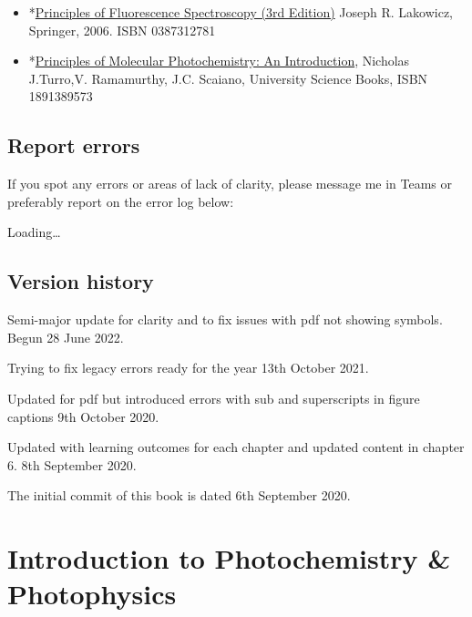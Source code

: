\documentclass[
]{book}
\begin{document}
\begin{itemize}
\item
  *\href{https://link.springer.com/book/10.1007/978-0-387-46312-4}{Principles of Fluorescence Spectroscopy (3rd Edition)} Joseph R. Lakowicz, Springer, 2006. ISBN 0387312781
\item
  *\href{https://bath-ac-primo.hosted.exlibrisgroup.com/primo-explore/fulldisplay?docid=44BAT_ALMA_DS2129552010002761\&context=L\&vid=44BAT_VU1\&lang=en_US\&search_scope=CSCOP_44BAT_DEEP\&adaptor=Local\%20Search\%20Engine\&tab=local\&query=any,contains,principles\%20of\%20molecular\%20photochemistry\%20ramamurthy\&offset=0\&pcAvailability=false}{Principles of Molecular Photochemistry: An Introduction}, Nicholas J.Turro,V. Ramamurthy, J.C. Scaiano, University Science Books, ISBN 1891389573
\end{itemize}

\hypertarget{report-errors}{%
\section{Report errors}\label{report-errors}}

If you spot any errors or areas of lack of clarity, please message me in Teams or preferably report on the error log below:

Loading\ldots{}

\hypertarget{version-history}{%
\section*{Version history}\label{version-history}}

Semi-major update for clarity and to fix issues with pdf not showing symbols. Begun 28 June 2022.

Trying to fix legacy errors ready for the year 13th October 2021.

Updated for pdf but introduced errors with sub and superscripts in figure captions 9th October 2020.

Updated with learning outcomes for each chapter and updated content in chapter 6. 8th September 2020.

The initial commit of this book is dated 6th September 2020.

\hypertarget{ch:Intro}{%
\chapter{Introduction to Photochemistry \& Photophysics}\label{ch:Intro}}
\end{document}
